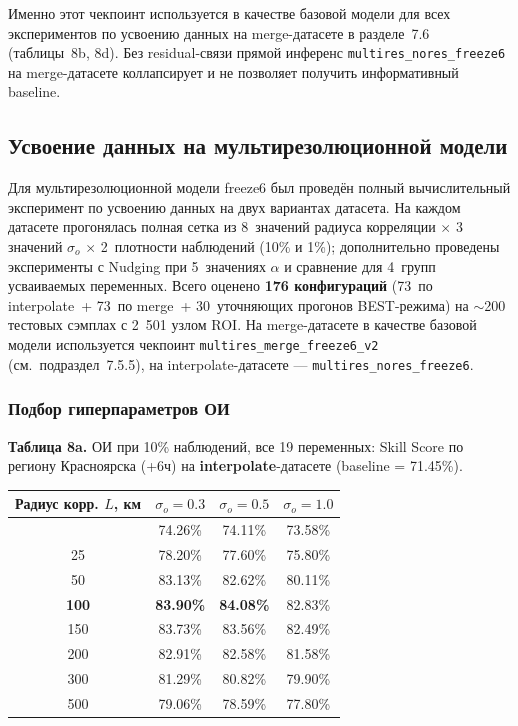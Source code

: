 \documentclass[14pt,a4paper]{extarticle}
\newcounter{none}
\numberwithin{table}{section}
\numberwithin{figure}{section}
\numberwithin{equation}{section}
\begin{document}
Именно этот чекпоинт используется в качестве базовой модели для всех
экспериментов по усвоению данных на merge-датасете в разделе~7.6
(таблицы~8b, 8d). Без residual-связи прямой инференс
\texttt{multires\_nores\_freeze6} на merge-датасете коллапсирует и не
позволяет получить информативный baseline.

\subsection{Усвоение данных на мультирезолюционной модели}\label{ux443ux441ux432ux43eux435ux43dux438ux435-ux434ux430ux43dux43dux44bux445-ux43dux430-ux43cux443ux43bux44cux442ux438ux440ux435ux437ux43eux43bux44eux446ux438ux43eux43dux43dux43eux439-ux43cux43eux434ux435ux43bux438}

Для мультирезолюционной модели freeze6 был проведён полный
вычислительный эксперимент по усвоению данных на двух вариантах
датасета. На каждом датасете прогонялась полная сетка из 8~значений
радиуса корреляции \(\times\) 3 значений \(\sigma_o\) \(\times\) 2~плотности
наблюдений (10\% и 1\%); дополнительно проведены эксперименты с
Nudging при 5~значениях \(\alpha\) и сравнение для 4~групп усваиваемых
переменных. Всего оценено \textbf{176 конфигураций} (73~по
interpolate~+ 73~по merge~+ 30~уточняющих прогонов BEST-режима) на
\(\sim\)200 тестовых сэмплах с 2~501 узлом ROI. На merge-датасете в
качестве базовой модели используется чекпоинт
\texttt{multires\_merge\_freeze6\_v2} (см.~подраздел~7.5.5), на
interpolate-датасете --- \texttt{multires\_nores\_freeze6}.

\subsubsection{Подбор гиперпараметров ОИ}

\textbf{Таблица 8a.} ОИ при 10\% наблюдений, все 19 переменных: Skill
Score по региону Красноярска (+6ч) на \textbf{interpolate}-датасете
(baseline = 71.45\%).

{\def\LTcaptype{none}
\begin{longtable}[]{@{}cccc@{}}
\toprule\noalign{}
Радиус корр. $L$, км & $\sigma_o = 0.3$ & $\sigma_o = 0.5$ & $\sigma_o = 1.0$ \\
\midrule\noalign{}
\endhead
\bottomrule\noalign{}
\endlastfoot
10 & 74.26\% & 74.11\% & 73.58\% \\
25 & 78.20\% & 77.60\% & 75.80\% \\
50 & 83.13\% & 82.62\% & 80.11\% \\
\textbf{100} & \textbf{83.90\%} & \textbf{84.08\%} & 82.83\% \\
150 & 83.73\% & 83.56\% & 82.49\% \\
200 & 82.91\% & 82.58\% & 81.58\% \\
300 & 81.29\% & 80.82\% & 79.90\% \\
500 & 79.06\% & 78.59\% & 77.80\% \\
\end{longtable}
}
\end{document}
